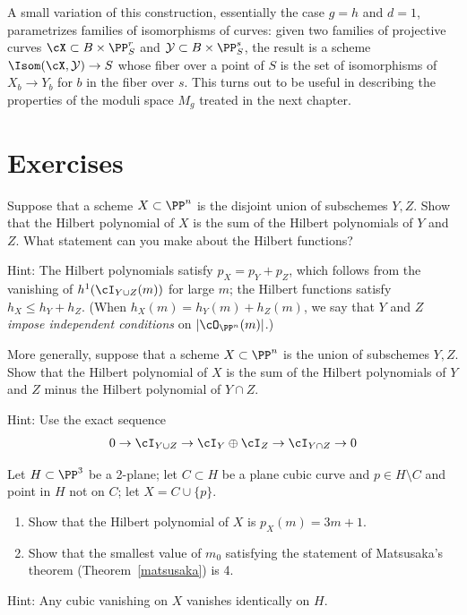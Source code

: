 A small variation of this construction, essentially the case $g=h$
and $d=1$, parametrizes families of
isomorphisms of curves: given two families of projective curves $\cX
\subset B \times \PP^r_{S}$ and $\mathcal{Y} \subset B\times \PP^s_{S}$,
%
%
the result is a scheme $\Isom(\cX, \mathcal{Y}) \to S$ whose
fiber over a point of $S$ is the set of isomorphisms of $X_{b}\to Y_{b}$
for $b$ in the fiber over $s$.
This turns out to be useful in describing the properties of the moduli
space $M_{g}$ treated in the
next chapter.

\section{Exercises}

\begin{exercise}
\label{deg of disjoint union}
Suppose that a scheme $X\subset \PP^n$ is the disjoint union of subschemes
$Y,Z$. Show that the
Hilbert polynomial
of
$X$ is the sum of the Hilbert polynomials of $Y$ and $Z$. What statement
%
%
can you make about the
Hilbert functions?%

Hint: The Hilbert polynomials satisfy $p_X = p_Y + p_Z$, which follows
from the vanishing of $h^1(\cI_{Y\cup Z} (m))$ for large $m$; the
Hilbert functions satisfy $h_X \leq h_Y + h_Z$. (When $h_X(m) = h_Y(m)
+ h_Z(m)$, we say that $Y$ and $Z$
\emph{impose independent conditions}
%
on $|\cO_{\PP^n}(m)|$.)
\end{exercise}

\begin{exercise}
More generally, suppose that a scheme $X\subset \PP^n$ is the union of
subschemes $Y,Z$. Show that the Hilbert polynomial of
$X$ is the sum of the Hilbert polynomials of $Y$ and $Z$ minus the
Hilbert polynomial of $Y\cap Z$.

Hint: Use the exact sequence
$$
0 \to \cI_{Y\cup Z} \to \cI_{Y} \oplus \cI_{Z} \to \cI_{Y \cap Z} \to 0
$$
\end{exercise}

\begin{exercise}
Let $H \subset \PP^3$ be a 2-plane; let $C \subset H$ be a
plane cubic
%
%
curve and $p \in H \setminus C$ and point in $H$ not on $C$; let $X =
C \cup \{p\}$.
\begin{enumerate}
\item Show that the Hilbert polynomial of $X$ is $p_X(m) = 3m+1$.
\item Show that the smallest value of $m_0$ satisfying the statement of
Matsusaka's theorem (Theorem~\ref{matsusaka})
%
 is 4.
\end{enumerate}

Hint: Any cubic vanishing on $X$ vanishes identically on $H$.
\end{exercise}


